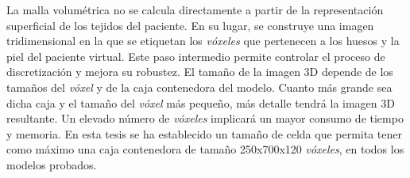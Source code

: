 La malla volumétrica no se calcula directamente a partir de la representación superficial de los tejidos del paciente. En su lugar, se construye una imagen tridimensional en la que se etiquetan los \emph{vóxeles} que pertenecen a los huesos y la piel del paciente virtual. Este paso intermedio permite controlar el proceso de discretización y mejora su robustez.
El tamaño de la imagen 3D depende de los tamaños del \emph{vóxel} y de la caja contenedora del modelo. Cuanto más grande sea dicha caja y el tamaño del \emph{vóxel} más pequeño, más detalle tendrá la imagen 3D resultante. Un elevado número de \emph{vóxeles} implicará un mayor consumo de tiempo y memoria.
En esta tesis se ha establecido un tamaño de celda que permita tener como máximo una caja contenedora de tamaño 250x700x120 \emph{vóxeles}, en todos los modelos probados.

